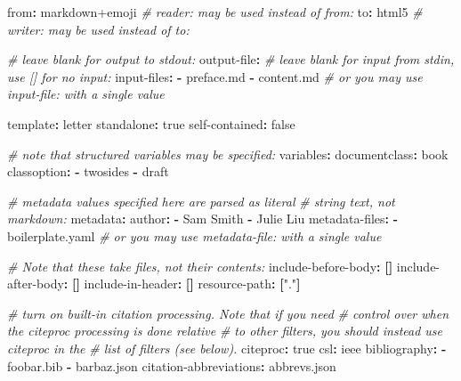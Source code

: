 \documentclass[]{article}
\newenvironment{Shaded}{}{}
\newcommand{\AttributeTok}[1]{\textcolor[rgb]{0.49,0.56,0.16}{#1}}
\newcommand{\CharTok}[1]{\textcolor[rgb]{0.25,0.44,0.63}{#1}}
\newcommand{\CommentTok}[1]{\textcolor[rgb]{0.38,0.63,0.69}{\textit{#1}}}
\newcommand{\FunctionTok}[1]{\textcolor[rgb]{0.02,0.16,0.49}{#1}}
\newcommand{\KeywordTok}[1]{\textcolor[rgb]{0.00,0.44,0.13}{\textbf{#1}}}
\newcommand{\StringTok}[1]{\textcolor[rgb]{0.25,0.44,0.63}{#1}}
\begin{document}
\begin{Shaded}
\begin{Highlighting}[]
\FunctionTok{from}\KeywordTok{:}\AttributeTok{ markdown+emoji}
\CommentTok{\# reader: may be used instead of from:}
\FunctionTok{to}\KeywordTok{:}\AttributeTok{ html5}
\CommentTok{\# writer: may be used instead of to:}

\CommentTok{\# leave blank for output to stdout:}
\FunctionTok{output{-}file}\KeywordTok{:}
\CommentTok{\# leave blank for input from stdin, use [] for no input:}
\FunctionTok{input{-}files}\KeywordTok{:}
\KeywordTok{{-}}\AttributeTok{ preface.md}
\KeywordTok{{-}}\AttributeTok{ content.md}
\CommentTok{\# or you may use input{-}file: with a single value}

\FunctionTok{template}\KeywordTok{:}\AttributeTok{ letter}
\FunctionTok{standalone}\KeywordTok{:}\AttributeTok{ }\CharTok{true}
\FunctionTok{self{-}contained}\KeywordTok{:}\AttributeTok{ }\CharTok{false}

\CommentTok{\# note that structured variables may be specified:}
\FunctionTok{variables}\KeywordTok{:}
\AttributeTok{  }\FunctionTok{documentclass}\KeywordTok{:}\AttributeTok{ book}
\AttributeTok{  }\FunctionTok{classoption}\KeywordTok{:}
\AttributeTok{    }\KeywordTok{{-}}\AttributeTok{ twosides}
\AttributeTok{    }\KeywordTok{{-}}\AttributeTok{ draft}

\CommentTok{\# metadata values specified here are parsed as literal}
\CommentTok{\# string text, not markdown:}
\FunctionTok{metadata}\KeywordTok{:}
\AttributeTok{  }\FunctionTok{author}\KeywordTok{:}
\AttributeTok{  }\KeywordTok{{-}}\AttributeTok{ Sam Smith}
\AttributeTok{  }\KeywordTok{{-}}\AttributeTok{ Julie Liu}
\FunctionTok{metadata{-}files}\KeywordTok{:}
\KeywordTok{{-}}\AttributeTok{ boilerplate.yaml}
\CommentTok{\# or you may use metadata{-}file: with a single value}

\CommentTok{\# Note that these take files, not their contents:}
\FunctionTok{include{-}before{-}body}\KeywordTok{:}\AttributeTok{ }\KeywordTok{[]}
\FunctionTok{include{-}after{-}body}\KeywordTok{:}\AttributeTok{ }\KeywordTok{[]}
\FunctionTok{include{-}in{-}header}\KeywordTok{:}\AttributeTok{ }\KeywordTok{[]}
\FunctionTok{resource{-}path}\KeywordTok{:}\AttributeTok{ }\KeywordTok{[}\StringTok{"."}\KeywordTok{]}

\CommentTok{\# turn on built{-}in citation processing.  Note that if you need}
\CommentTok{\# control over when the citeproc processing is done relative}
\CommentTok{\# to other filters, you should instead use \textasciigrave{}citeproc\textasciigrave{} in the}
\CommentTok{\# list of \textasciigrave{}filters\textasciigrave{} (see below).}
\FunctionTok{citeproc}\KeywordTok{:}\AttributeTok{ }\CharTok{true}
\FunctionTok{csl}\KeywordTok{:}\AttributeTok{ ieee}
\FunctionTok{bibliography}\KeywordTok{:}
\KeywordTok{{-}}\AttributeTok{ foobar.bib}
\KeywordTok{{-}}\AttributeTok{ barbaz.json}
\FunctionTok{citation{-}abbreviations}\KeywordTok{:}\AttributeTok{ abbrevs.json}


\end{Highlighting}
\end{Shaded}
\end{document}
